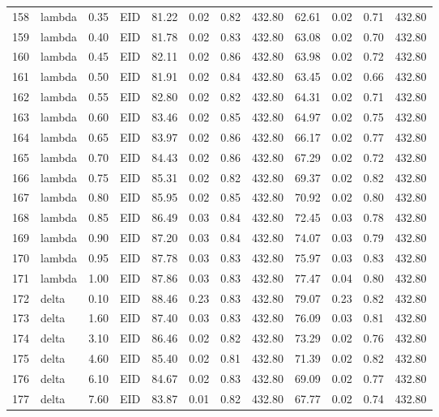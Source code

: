 \begin{table}[ht]
\begin{tabular}{rlrlrrrrrrrr}
  158 & lambda & 0.35 & EID & 81.22 & 0.02 & 0.82 & 432.80 & 62.61 & 0.02 & 0.71 & 432.80 \\ 
  159 & lambda & 0.40 & EID & 81.78 & 0.02 & 0.83 & 432.80 & 63.08 & 0.02 & 0.70 & 432.80 \\ 
  160 & lambda & 0.45 & EID & 82.11 & 0.02 & 0.86 & 432.80 & 63.98 & 0.02 & 0.72 & 432.80 \\ 
  161 & lambda & 0.50 & EID & 81.91 & 0.02 & 0.84 & 432.80 & 63.45 & 0.02 & 0.66 & 432.80 \\ 
  162 & lambda & 0.55 & EID & 82.80 & 0.02 & 0.82 & 432.80 & 64.31 & 0.02 & 0.71 & 432.80 \\ 
  163 & lambda & 0.60 & EID & 83.46 & 0.02 & 0.85 & 432.80 & 64.97 & 0.02 & 0.75 & 432.80 \\ 
  164 & lambda & 0.65 & EID & 83.97 & 0.02 & 0.86 & 432.80 & 66.17 & 0.02 & 0.77 & 432.80 \\ 
  165 & lambda & 0.70 & EID & 84.43 & 0.02 & 0.86 & 432.80 & 67.29 & 0.02 & 0.72 & 432.80 \\ 
  166 & lambda & 0.75 & EID & 85.31 & 0.02 & 0.82 & 432.80 & 69.37 & 0.02 & 0.82 & 432.80 \\ 
  167 & lambda & 0.80 & EID & 85.95 & 0.02 & 0.85 & 432.80 & 70.92 & 0.02 & 0.80 & 432.80 \\ 
  168 & lambda & 0.85 & EID & 86.49 & 0.03 & 0.84 & 432.80 & 72.45 & 0.03 & 0.78 & 432.80 \\ 
  169 & lambda & 0.90 & EID & 87.20 & 0.03 & 0.84 & 432.80 & 74.07 & 0.03 & 0.79 & 432.80 \\ 
  170 & lambda & 0.95 & EID & 87.78 & 0.03 & 0.83 & 432.80 & 75.97 & 0.03 & 0.83 & 432.80 \\ 
  171 & lambda & 1.00 & EID & 87.86 & 0.03 & 0.83 & 432.80 & 77.47 & 0.04 & 0.80 & 432.80 \\ 
  172 & delta & 0.10 & EID & 88.46 & 0.23 & 0.83 & 432.80 & 79.07 & 0.23 & 0.82 & 432.80 \\ 
  173 & delta & 1.60 & EID & 87.40 & 0.03 & 0.83 & 432.80 & 76.09 & 0.03 & 0.81 & 432.80 \\ 
  174 & delta & 3.10 & EID & 86.46 & 0.02 & 0.82 & 432.80 & 73.29 & 0.02 & 0.76 & 432.80 \\ 
  175 & delta & 4.60 & EID & 85.40 & 0.02 & 0.81 & 432.80 & 71.39 & 0.02 & 0.82 & 432.80 \\ 
  176 & delta & 6.10 & EID & 84.67 & 0.02 & 0.83 & 432.80 & 69.09 & 0.02 & 0.77 & 432.80 \\ 
  177 & delta & 7.60 & EID & 83.87 & 0.01 & 0.82 & 432.80 & 67.77 & 0.02 & 0.74 & 432.80 \\ 

\end{tabular}
\end{table}
